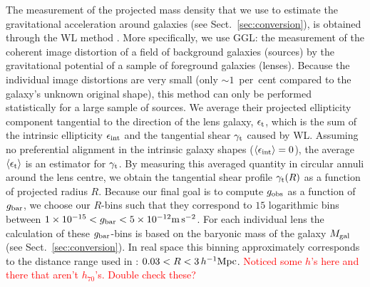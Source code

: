 \documentclass[usenatbib]{mnras}
\newcommand{\hMpc}{\, h^{-1}{\rm{Mpc}} }
\newcommand{\mpss}{ {\rm m}\,{\rm s}^{-2} }
\newcommand{\lan}{\langle}
\newcommand{\ran}{\rangle}
\newcommand*{\E}[1]{\times 10^{#1}}
\newcommand{\un}[1]{_{\rm #1}}
\begin{document}
The measurement of the projected mass density that we use to estimate the gravitational acceleration around galaxies (see Sect.~\ref{sec:conversion}), is obtained through the WL method \cite[for a general introduction, see][]{bartelmann2001,schneider2006}. More specifically, we use GGL: the measurement of the coherent image distortion of a field of background galaxies (sources) by the gravitational potential of a sample of foreground galaxies (lenses). Because the individual image distortions are very small (only $\sim1$~per~cent compared to the galaxy's unknown original shape), this method can only be performed statistically for a large sample of sources. We average their projected ellipticity component tangential to the direction of the lens galaxy, $\epsilon\un{t}$, which is the sum of the intrinsic ellipticity $\epsilon\un{int}$ and the tangential shear $\gamma\un{t}$ caused by WL. Assuming no preferential alignment in the intrinsic galaxy shapes ($\lan\epsilon\un{int}\ran=0$), the average $\lan\epsilon\un{t}\ran$ is an estimator for $\gamma\un{t}$. By measuring this averaged quantity in circular annuli around the lens centre, we obtain the tangential shear profile $\gamma\un{t}(R)$ as a function of projected radius $R$. Because our final goal is to compute $g\un{obs}$ as a function of $g\un{bar}$, we choose our $R$-bins such that they correspond to $15$ logarithmic bins between $1\E{-15} < g\un{bar} < 5\E{-12} \mpss$. For each individual lens the calculation of these $g\un{bar}$-bins is based on the baryonic mass of the galaxy $M\un{gal}$ (see Sect.~\ref{sec:conversion}). In real space this binning approximately corresponds to the distance range used in \cite{brouwer2017}: $0.03 < R < 3 \hMpc$. \textcolor{red}{Noticed some $h$'s here and there that aren't $h_{70}$'s. Double check these?}
\end{document}
